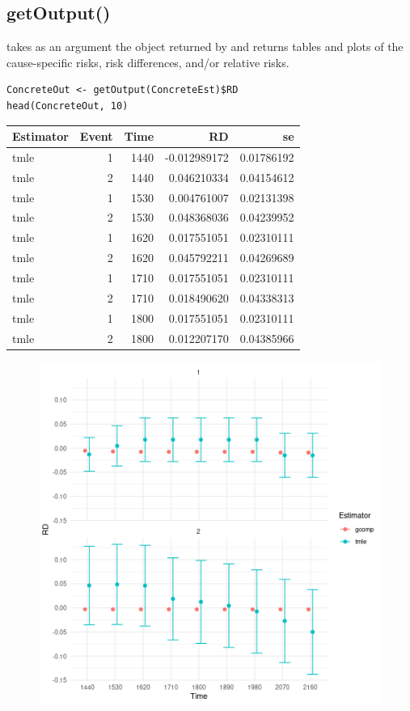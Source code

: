 \documentclass{report}
\newcommand{\1}{\ensuremath{\mathbf{1}}}
\begin{document}
\subsection{getOutput()}
\label{getoutput}
 takes as an argument the  object returned by  and returns tables and plots of the cause-specific risks, risk differences, and/or relative risks.

\begin{lstlisting}
ConcreteOut <- getOutput(ConcreteEst)$RD
head(ConcreteOut, 10)
\end{lstlisting}

\begin{center}
\begin{tabular}{lrrrr}
Estimator & Event & Time & RD & se\\
\hline
tmle & 1 & 1440 & -0.012989172 & 0.01786192\\
tmle & 2 & 1440 & 0.046210334 & 0.04154612\\
tmle & 1 & 1530 & 0.004761007 & 0.02131398\\
tmle & 2 & 1530 & 0.048368036 & 0.04239952\\
tmle & 1 & 1620 & 0.017551051 & 0.02310111\\
tmle & 2 & 1620 & 0.045792211 & 0.04269689\\
tmle & 1 & 1710 & 0.017551051 & 0.02310111\\
tmle & 2 & 1710 & 0.018490620 & 0.04338313\\
tmle & 1 & 1800 & 0.017551051 & 0.02310111\\
tmle & 2 & 1800 & 0.012207170 & 0.04385966\\
\end{tabular}
\end{center}


\begin{figure}[H]
\includegraphics[width=0.9\linewidth]{concrete-pbc.png}
\end{figure}
\end{document}
